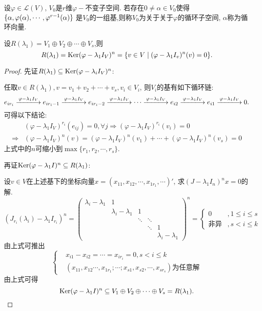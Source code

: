 \begin{definition}
  设$\varphi \in \mathcal{L}(V)$, $V_0$是$r$维$\varphi-$不变子空间.
  若存在$0 \neq \alpha \in V_0$使得
  $\{\alpha,\varphi(\alpha),\cdots,\\
  \varphi^{r-1}(\alpha)\}$
  是$V_0$的一组基,则称$V_0$为关于关于$\varphi$的循环子空间,
  $\alpha$称为循环向量.
\end{definition}

\begin{theory}\label{thr:JDapp1}
  设$R(\lambda_1)=V_1\oplus V_2 \oplus \cdots \oplus V_s$,则
  \[R(\lambda_1)=\operatorname{Ker}(\varphi-\lambda_1 I_V)^n=
  \{v\in V \mid (\varphi-\lambda_1 I_v)^n(v)=0\}.\]
\end{theory}

\begin{proof}
  先证$R(\lambda_1) \subseteq \operatorname{Ker}(\varphi-\lambda_i I_V)^n$:

  任取$v\in R(\lambda_1), v=v_1+v_2+\cdots+v_s, v_i\in V_i$,
  则$V_i$的基有如下循环链:
  \[e_{ir_i} \xlongrightarrow {\varphi-\lambda_1 I_V} e_{ir_i-1} \xlongrightarrow {\varphi-\lambda_1 I_V}
  e_{ir_i-2} \xlongrightarrow {\varphi-\lambda_1 I_V} \cdots \xlongrightarrow {\varphi-\lambda_1 I_V}
  e_{i2} \xlongrightarrow {\varphi-\lambda_1 I_V} e_{i1} \xlongrightarrow {\varphi-\lambda_1 I_V} 0.\]
可得以下结论:
\begin{align*}
  & (\varphi-\lambda_1 I_V)^{r_i}(e_{ij})=0, \forall j \Longrightarrow
  (\varphi-\lambda_1 I_V)^{r_i}(v_i)=0\\
  \Longrightarrow & (\varphi-\lambda_1 I_V)^n(v)=
  (\varphi-\lambda_1 I_V)^n(v_1)+\cdots+(\varphi-\lambda_1 I_V)^n(v_s)=0
\end{align*}
上式中的$n$可缩小到$\max\{r_1,r_2,\cdots,r_s\}$.

再证$\operatorname{Ker}(\varphi-\lambda_1 I)^n\subseteq R(\lambda_1)$:

设$v\in V$在上述基下的坐标向量$x=(x_{11},x_{12},\cdots,x_{1r_1},\cdots)'$,
求$(J-\lambda_1 I_n)^nx=0$的解.
\[ (J_{r_i}(\lambda_i)-\lambda_1 I_{r_i})^n=
  \begin{pmatrix}
    \lambda_i-\lambda_1&1&&&\\
                       &\lambda_i-\lambda_1&1&&\\
                       &&\ddots&\ddots&\\
                       &&&\ddots&1\\
    &&&&\lambda_i-\lambda_1
  \end{pmatrix}^n=\left\{
    \begin{aligned}
      0& , 1 \leq i \leq s\\
      \text{非异}& , s < i \leq k
    \end{aligned}\right.
\]
由上式可推出
\[
\left\{
  \begin{aligned}
    & x_{i1}-x_{i2}=\cdots=x_{ir_i}=0 , s < i \leq k\\
    & (x_{11},x_{12}\cdots,x_{1r_1};\cdots;x_{s1},x_{s2},\cdots,x_{sr_s})
    \text{为任意解}
  \end{aligned}\right.
\]
由上式可得
\[\operatorname{Ker}(\varphi-\lambda_1 I)^n \subseteq
  V_1\oplus V_2 \oplus \cdots \oplus V_s=R(\lambda_1).\]
\end{proof}
